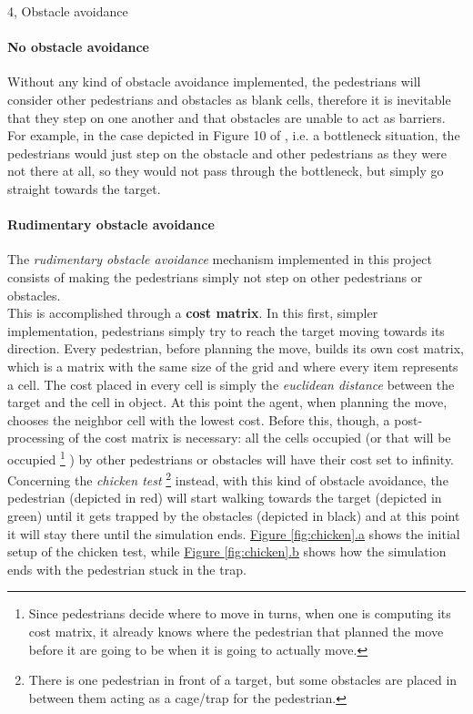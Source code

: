 \documentclass[10pt,a4paper]{article}
\begin{document}
\begin{task}{4, Obstacle avoidance}
\paragraph{No obstacle avoidance}
Without any kind of obstacle avoidance implemented, the pedestrians will consider other pedestrians and obstacles as blank cells, therefore it is inevitable that they step on one another and that obstacles are unable to act as barriers.\\
For example, in the case depicted in Figure 10 of \cite{RiMEA}, i.e. a bottleneck situation, the pedestrians would just step on the obstacle and other pedestrians as they were not there at all, so they would not pass through the bottleneck, but simply go straight towards the target.

\paragraph{Rudimentary obstacle avoidance}
The \textit{rudimentary obstacle avoidance} mechanism implemented in this project consists of making the pedestrians simply not step on other pedestrians or obstacles.\\
This is accomplished through a \textbf{cost matrix}.
In this first, simpler implementation, pedestrians simply try to reach the target moving towards its direction.
Every pedestrian, before planning the move, builds its own cost matrix, which is a matrix with the same size of the grid and where every item represents a cell.
The cost placed in every cell is simply the \textit{euclidean distance} between the target and the cell in object.
At this point the agent, when planning the move, chooses the neighbor cell with the lowest cost.
Before this, though, a post-processing of the cost matrix is necessary: all the cells occupied (or that will be occupied
\footnote{Since pedestrians decide where to move in turns, when one is computing its cost matrix, it already knows where the pedestrian that planned the move before it are going to be when it is going to actually move.}
) by other pedestrians or obstacles will have their cost set to infinity.\\
Concerning the \textit{chicken test}
\footnote{There is one pedestrian in front of a target, but some obstacles are placed in between them acting as a cage/trap for the pedestrian.}
instead, with this kind of obstacle avoidance, the pedestrian (depicted in red) will start walking towards the target (depicted in green) until it gets trapped by the obstacles (depicted in black) and at this point it will stay there until the simulation ends.
\hyperref[fig:chicken]{Figure \ref{fig:chicken}.a} shows the initial setup of the chicken test, while \hyperref[fig:chicken]{Figure \ref{fig:chicken}.b} shows how the simulation ends with the pedestrian stuck in the trap.


\end{task}
\end{document}
